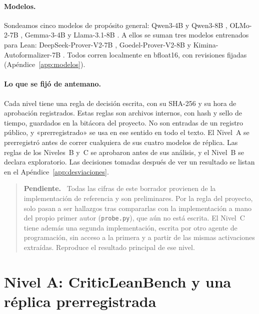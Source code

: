 \documentclass[10pt]{article}
\newcommand{\vr}[1]{\texttt{#1}}
\newenvironment{pendiente}{\begin{quote}\small\noindent\textbf{Pendiente.}\ }{\end{quote}}
\begin{document}
\paragraph{Modelos.}
Sondeamos cinco modelos de propósito general: Qwen3-4B y Qwen3-8B \citep{qwen3}, OLMo-2-7B \citep{olmo2},
Gemma-3-4B \citep{gemma3} y Llama-3.1-8B \citep{llama3}. A ellos se suman tres modelos entrenados para Lean:
DeepSeek-Prover-V2-7B \citep{deepseekproverv2}, Goedel-Prover-V2-8B \citep{goedelproverv2} y
Kimina-Autoformalizer-7B \citep{kimina,kiminaautoformalizer}. Todos corren localmente en bfloat16, con
revisiones fijadas (Apéndice~\ref{app:modelos}).

\paragraph{Lo que se fijó de antemano.}
Cada nivel tiene una regla de decisión escrita, con su SHA-256 y su hora de aprobación registrados. Estas reglas son
archivos internos, con hash y sello de tiempo, guardados en la bitácora del proyecto. No son entradas de un registro
público, y «prerregistrado» se usa en ese sentido en todo el texto. El Nivel~A se prerregistró antes de correr
cualquiera de sus cuatro modelos de réplica. Las reglas de los Niveles~B y~C se aprobaron antes de sus análisis, y
el Nivel~B se declara exploratorio. Las decisiones tomadas después de ver un resultado se listan en el
Apéndice~\ref{app:desviaciones}.

\begin{pendiente}
Todas las cifras de este borrador provienen de la implementación de referencia y son preliminares. Por la regla del
proyecto, solo pasan a ser hallazgos tras compararlas con la implementación a mano del propio primer autor
(\vr{probe.py}), que aún no está escrita. El Nivel~C tiene además una segunda implementación, escrita por otro agente
de programación, sin acceso a la primera y a partir de las mismas activaciones extraídas. Reproduce el resultado
principal de ese nivel.
\end{pendiente}

\section{Nivel A: CriticLeanBench y una réplica prerregistrada}
\end{document}
